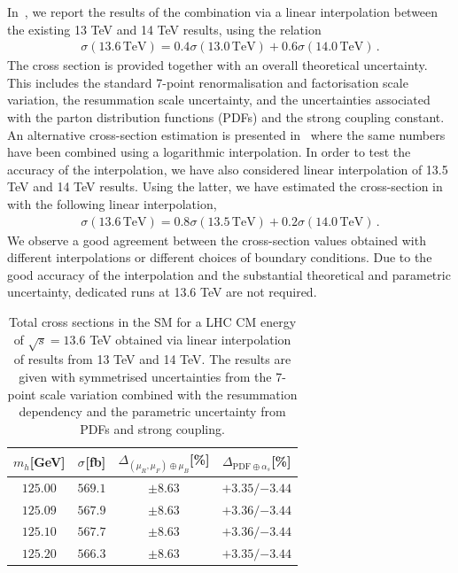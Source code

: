 \documentclass[11pt,a4paper]{article}
\begin{document}
In~, we report the results of the \nlonnllpart{} combination via a linear interpolation between the existing 13 TeV and 14 TeV results, using the relation
\begin{align}
\sigma(13.6\,\text{TeV})=0.4\sigma(13.0\,\text{TeV})+0.6\sigma(14.0\,\text{TeV})\,.
\end{align}
The cross section is provided together with an overall theoretical uncertainty. This includes the standard 7-point renormalisation and factorisation scale variation, the resummation scale uncertainty, and the uncertainties associated with the parton distribution functions (PDFs) and the strong coupling constant. An alternative cross-section estimation is presented in~ where the same numbers have been combined using a logarithmic interpolation. In order to test the accuracy of the interpolation, we have also considered linear interpolation of 13.5 TeV and 14 TeV results. Using the latter, we have estimated the cross-section in~ with the following linear interpolation,
\begin{align}
	\sigma(13.6\,\text{TeV})=0.8\sigma(13.5\,\text{TeV})+0.2\sigma(14.0\,\text{TeV})\,.
\end{align}
We observe a good agreement between the cross-section values obtained with different interpolations or different choices of boundary conditions. Due to the good accuracy of the interpolation and the substantial theoretical and parametric uncertainty, dedicated runs at 13.6 TeV are not required.

\begin{table}[ht!]
\begin{center}%
\begin{small}%
\begin{tabular}{cccc}%
$m_h$[GeV] & $\sigma^{}$[fb] & $\Delta_{\left(\mu_{R},\mu_{F}\right)\oplus\mu_{B}}$[\%] & $\Delta_{\mathrm{PDF}\oplus\alpha_s}$[\%]  \\\hline
$125.00$ & $569.1$ & $\pm8.63$ & ${{+3.35}}/{-3.44}$ \\
$125.09$ & $567.9$ & $\pm8.63$ & ${{+3.36}}/{-3.44}$ \\
$125.10$ & $567.7$ & $\pm8.63$ & ${{+3.36}}/{-3.44}$ \\
$125.20$ & $566.3$ & $\pm8.63$ & ${{+3.35}}/{-3.44}$ 
\end{tabular}%
\end{small}%
\end{center}%
\caption{Total \bbH{} cross sections in the SM for a LHC CM energy of $\sqrt{s}=13.6$ TeV obtained via linear interpolation of results from 13 TeV and 14 TeV. The results are given with symmetrised uncertainties from the 7-point scale variation combined with the resummation dependency and the parametric uncertainty from PDFs and strong coupling.}
\label{tab:bbH136lin}
\end{table}
\end{document}
